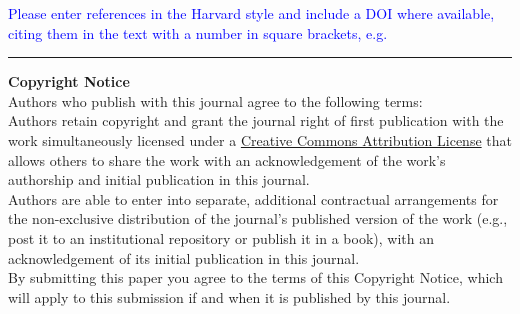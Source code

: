 \documentclass{jors}
\begin{document}
\textcolor{blue}{Please enter references in the Harvard style and include a DOI where available, citing them in the text with a number in square brackets, e.g. \\ }

\printbibliography

\vspace{2cm}

\rule{\textwidth}{1pt}

{ \bf Copyright Notice} \\
Authors who publish with this journal agree to the following terms: \\

Authors retain copyright and grant the journal right of first publication with the work simultaneously licensed under a  \href{http://creativecommons.org/licenses/by/3.0/}{Creative Commons Attribution License} that allows others to share the work with an acknowledgement of the work's authorship and initial publication in this journal. \\

Authors are able to enter into separate, additional contractual arrangements for the non-exclusive distribution of the journal's published version of the work (e.g., post it to an institutional repository or publish it in a book), with an acknowledgement of its initial publication in this journal. \\

By submitting this paper you agree to the terms of this Copyright Notice, which will apply to this submission if and when it is published by this journal.
\end{document}
